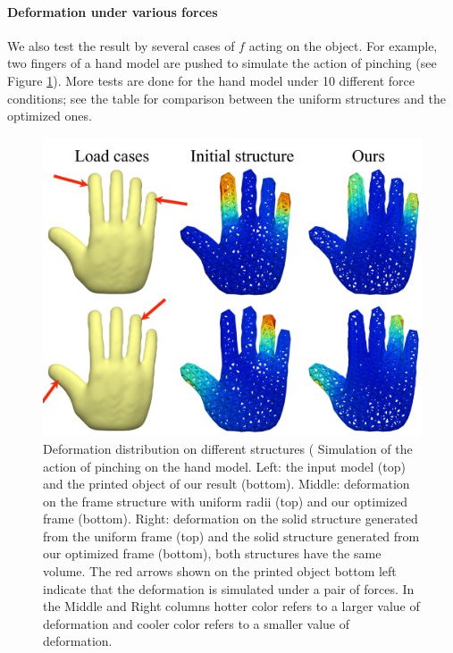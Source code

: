 \paragraph{Deformation under various forces}
We also test the result by several cases of $f$ acting on the object.
For example, two fingers of a hand model are pushed to simulate the action of pinching (see Figure \ref{fig:result-validation-sample-force}).
More tests are done for the hand model under 10 different force conditions; see the table for
comparison between the uniform structures and the optimized ones.


\begin{figure}[h]
  \centering
\includegraphics[width=\linewidth]{Figures/hand/hand.pdf}
  \caption{\label{fig:result-validation-sample-force} Deformation distribution on different structures (
            Simulation of the action of pinching on the hand model.
            Left: the input model (top) and the printed object of our result (bottom).
            Middle: deformation on the frame structure with uniform radii (top) and our optimized frame (bottom).
            Right: deformation on the solid structure generated from the uniform frame (top) and the solid structure generated from our optimized frame (bottom), both structures have the same volume.
            The red arrows shown on the printed object bottom left indicate that the deformation is simulated under a pair of forces.
            In the Middle and Right columns hotter color refers to a larger value of deformation and cooler color refers to a smaller value of deformation.
            }
\end{figure}


